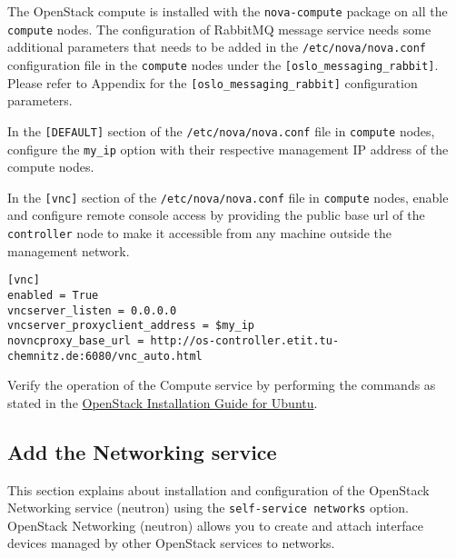 
The OpenStack compute is installed with the \verb|nova-compute| package on all the \verb|compute| nodes.
The configuration of RabbitMQ message service needs some additional parameters that needs to be added in the \verb|/etc/nova/nova.conf| configuration file in the \verb|compute| nodes under the \verb|[oslo_messaging_rabbit]|.
\\Please refer to Appendix  for the \verb|[oslo_messaging_rabbit]| configuration parameters.


In the \texttt{[DEFAULT]} section of the \verb|/etc/nova/nova.conf| file in \verb|compute| nodes, configure the \verb|my_ip| option with their respective management IP address of the compute nodes.

In the \texttt{[vnc]} section of the \verb|/etc/nova/nova.conf| file in \verb|compute| nodes, enable and configure remote console access by providing the public base url of the \verb|controller| node to make it accessible from any machine outside the management network.

\begin{lstlisting}[frame=single]
[vnc]
enabled = True
vncserver_listen = 0.0.0.0
vncserver_proxyclient_address = $my_ip
novncproxy_base_url = http://os-controller.etit.tu-chemnitz.de:6080/vnc_auto.html
\end{lstlisting}

Verify the operation of the Compute service by performing the commands as stated in the \href{http://docs.openstack.org/liberty/install-guide-ubuntu/} {OpenStack Installation Guide for Ubuntu}.

\subsection{Add the Networking service}\label{ssec:AddtheNetworkingservice}
This section explains about installation and configuration of the OpenStack Networking service (neutron) using the \verb|self-service networks| option.
OpenStack Networking (neutron) allows you to create and attach interface devices managed by other OpenStack services to networks.


